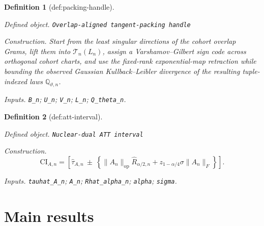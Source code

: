 \documentclass{article}
\newtheorem{definition}{Definition}
\begin{document}
\begin{definition}[def:packing-handle]\label{def:packing-handle}
\par\smallskip\noindent\emph{Defined object.} \texttt{Overlap-\allowbreak{}aligned tangent-\allowbreak{}packing handle}
\par\smallskip\noindent\emph{Construction.} Start from the least singular directions of the cohort overlap Grams, lift them into \(\mathcal T_n(L_n)\), assign a Varshamov--Gilbert sign code across orthogonal cohort charts, and use the fixed-rank exponential-map retraction while bounding the observed Gaussian Kullback--Leibler divergence of the resulting tuple-indexed laws \(\mathbb Q_{\vartheta,n}\).
\par\smallskip\noindent\emph{Inputs.} \texttt{B\_\allowbreak{}n}; \texttt{U\_\allowbreak{}n}; \texttt{V\_\allowbreak{}n}; \texttt{L\_\allowbreak{}n}; \texttt{Q\_\allowbreak{}theta\_\allowbreak{}n}.
\end{definition}

\begin{definition}[def:att-interval]\label{def:att-interval}
\par\smallskip\noindent\emph{Defined object.} \texttt{Nuclear-\allowbreak{}dual ATT interval}
\par\smallskip\noindent\emph{Construction.} \[\mathrm{CI}_{A,n}=\left[\widehat\tau_{A,n}\ \pm\ \left\{\lVert A_n\rVert_{\mathrm{op}}\widehat R_{\alpha/2,n}+z_{1-\alpha/4}\sigma\lVert A_n\rVert_F\right\}\right].\]
\par\smallskip\noindent\emph{Inputs.} \texttt{tauhat\_\allowbreak{}A\_\allowbreak{}n}; \texttt{A\_\allowbreak{}n}; \texttt{Rhat\_\allowbreak{}alpha\_\allowbreak{}n}; \texttt{alpha}; \texttt{sigma}.
\end{definition}

\section{Main results}
\end{document}
